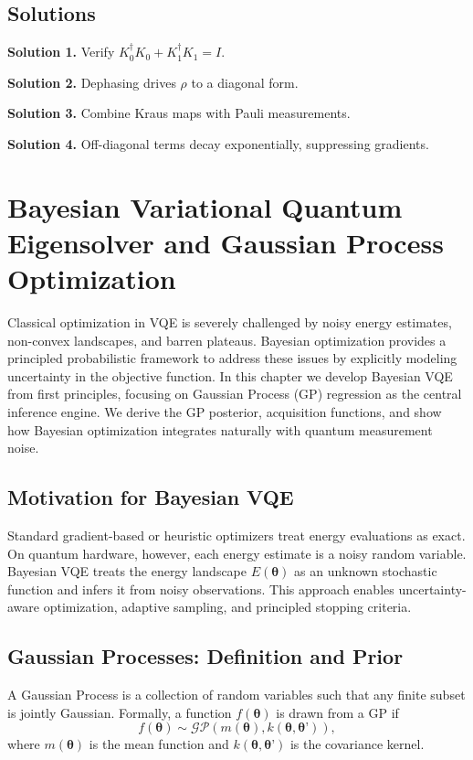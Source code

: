 \documentclass{book}
\begin{document}
\section{Solutions}

\textbf{Solution 1.} Verify $K_0^\dagger K_0 + K_1^\dagger K_1 = I$.

\textbf{Solution 2.} Dephasing drives $\rho$ to a diagonal form.

\textbf{Solution 3.} Combine Kraus maps with Pauli measurements.

\textbf{Solution 4.} Off-diagonal terms decay exponentially, suppressing gradients.




\chapter{Bayesian Variational Quantum Eigensolver and Gaussian Process Optimization}

Classical optimization in VQE is severely challenged by noisy energy
estimates, non-convex landscapes, and barren plateaus. Bayesian
optimization provides a principled probabilistic framework to address
these issues by explicitly modeling uncertainty in the objective
function. In this chapter we develop Bayesian VQE from first
principles, focusing on Gaussian Process (GP) regression as the
central inference engine. We derive the GP posterior, acquisition
functions, and show how Bayesian optimization integrates naturally
with quantum measurement noise.

\section{Motivation for Bayesian VQE}

Standard gradient-based or heuristic optimizers treat energy
evaluations as exact. On quantum hardware, however, each energy
estimate is a noisy random variable. Bayesian VQE treats the energy
landscape $E(\bm\theta)$ as an unknown stochastic function and infers
it from noisy observations. This approach enables uncertainty-aware
optimization, adaptive sampling, and principled stopping criteria.

\section{Gaussian Processes: Definition and Prior}

A Gaussian Process is a collection of random variables such that any finite subset is jointly Gaussian. Formally, a function $f(\bm\theta)$ is drawn from a GP if
\begin{equation}
f(\bm\theta) \sim \mathcal{GP}(m(\bm\theta), k(\bm\theta, \bm\theta’)),
\end{equation}
where $m(\bm\theta)$ is the mean function and $k(\bm\theta, \bm\theta’)$ is the covariance kernel.
\end{document}
